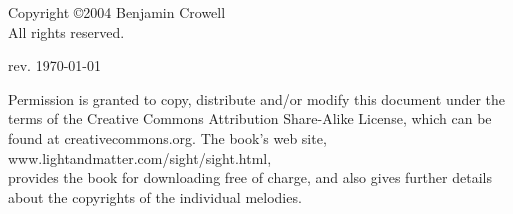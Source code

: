 \thispagestyle{empty}

\vspace*{100mm}

\noindent
Copyright \copyright  2004 Benjamin Crowell\\
All rights reserved.

\vspace{20mm}
\noindent
rev. \today{}

\vspace{6mm}
\noindent
Permission is granted to copy, distribute and/or modify this
document under the terms of the Creative Commons Attribution
Share-Alike License, which can be found at creativecommons.org.
The book's web site,\\
www.lightandmatter.com/sight/sight.html,\\
 provides the book
for downloading free of charge, and also gives further details
about the copyrights of the individual melodies.

